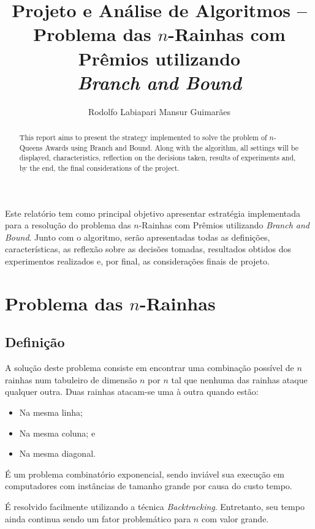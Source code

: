 \documentclass[12pt]{article}
\title{Projeto e Análise de Algoritmos -- \\ Problema das $n$-Rainhas com Prêmios utilizando \\\textit{Branch and Bound}}
\author{Rodolfo Labiapari Mansur Guimarães}
\begin{document}
\maketitle

\begin{abstract}
	This report aims to present the strategy implemented to solve the problem of $n$-Queens Awards using Branch and Bound. Along with the algorithm, all settings will be displayed, characteristics, reflection on the decisions taken, results of experiments and, by the end, the final considerations of the project.
\end{abstract}

\begin{resumo}
Este relatório tem como principal objetivo apresentar estratégia implementada para a resolução do problema das $n$-Rainhas com Prêmios utilizando \textit{Branch and Bound}. Junto com o algoritmo, serão apresentadas todas as definições, características, as reflexão sobre as decisões tomadas, resultados obtidos dos experimentos realizados e, por final, as  considerações finais de projeto.
\end{resumo}



\section{Problema das $n$-Rainhas}

	\subsection{Definição}
		 A solução deste problema consiste em encontrar uma combinação possível de $ n $ rainhas num tabuleiro de dimensão $ n $ por $ n $ tal que nenhuma das rainhas ataque qualquer outra. Duas rainhas atacam-se uma à outra quando estão:

		 \begin{itemize}
		 	\item Na mesma linha;
		 	\item Na mesma coluna; e
		 	\item Na mesma diagonal.
		 \end{itemize}

		É um problema combinatório exponencial, sendo inviável sua execução em computadores com instâncias de tamanho grande por causa do custo tempo.

		É resolvido facilmente utilizando a técnica \textit{Backtracking}. Entretanto, seu tempo ainda continua sendo um fator problemático para $ n $ com valor grande.
\end{document}
